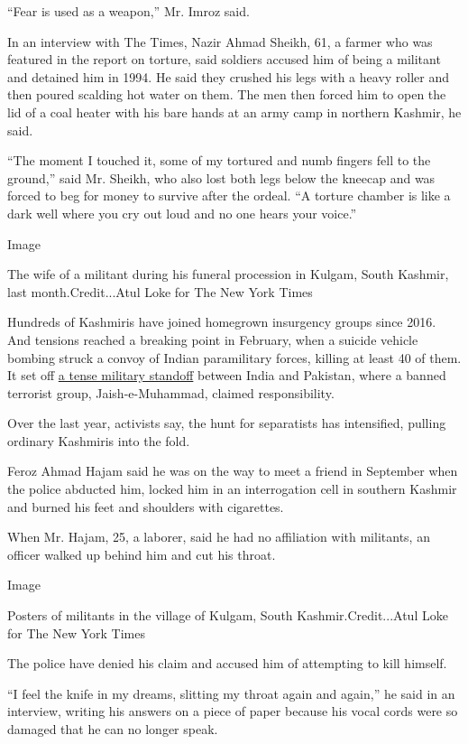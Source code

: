 ``Fear is used as a weapon,'' Mr. Imroz said.

In an interview with The Times, Nazir Ahmad Sheikh, 61, a farmer who was
featured in the report on torture, said soldiers accused him of being a
militant and detained him in 1994. He said they crushed his legs with a
heavy roller and then poured scalding hot water on them. The men then
forced him to open the lid of a coal heater with his bare hands at an
army camp in northern Kashmir, he said.

``The moment I touched it, some of my tortured and numb fingers fell to
the ground,'' said Mr. Sheikh, who also lost both legs below the kneecap
and was forced to beg for money to survive after the ordeal. ``A torture
chamber is like a dark well where you cry out loud and no one hears your
voice.''

Image

The wife of a militant during his funeral procession in Kulgam, South
Kashmir, last month.Credit...Atul Loke for The New York Times

Hundreds of Kashmiris have joined homegrown insurgency groups since
2016. And tensions reached a breaking point in February, when a suicide
vehicle bombing struck a convoy of Indian paramilitary forces, killing
at least 40 of them. It set off
\href{https://www.nytimes.com/2019/02/27/world/asia/kashmir-india-pakistan-aircraft.html?rref=collection\%2Fbyline\%2Fmaria-abi-habib}{a
tense military standoff} between India and Pakistan, where a banned
terrorist group, Jaish-e-Muhammad, claimed responsibility.

Over the last year, activists say, the hunt for separatists has
intensified, pulling ordinary Kashmiris into the fold.

Feroz Ahmad Hajam said he was on the way to meet a friend in September
when the police abducted him, locked him in an interrogation cell in
southern Kashmir and burned his feet and shoulders with cigarettes.

When Mr. Hajam, 25, a laborer, said he had no affiliation with
militants, an officer walked up behind him and cut his throat.

Image

Posters of militants in the village of Kulgam, South
Kashmir.Credit...Atul Loke for The New York Times

The police have denied his claim and accused him of attempting to kill
himself.

``I feel the knife in my dreams, slitting my throat again and again,''
he said in an interview, writing his answers on a piece of paper because
his vocal cords were so damaged that he can no longer speak.

